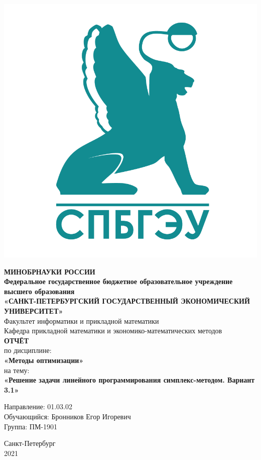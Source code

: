 \documentclass[14pt,a4paper,fleqn]{extarticle}
\begin{document}
\begin{titlepage}
	\vspace*{1cm}
	\includegraphics[scale=0.12]{logo}
	\begin{center}
		\textbf{МИНОБРНАУКИ РОССИИ}\\
		\vspace{0.2cm}
		\textbf{Федеральное государственное бюджетное образовательное учреждение высшего образования}\\
		\textbf{«САНКТ-ПЕТЕРБУРГСКИЙ ГОСУДАРСТВЕННЫЙ ЭКОНОМИЧЕСКИЙ УНИВЕРСИТЕТ»}\\
		\vspace{0.6cm}
		Факультет информатики и прикладной математики\\
		Кафедра прикладной математики и экономико-математических методов\\
		\vspace{1cm}
		\textbf{ОТЧЁТ}\\
		по дисциплине:\\
		\textbf{«Методы оптимизации»}\\
		на тему:\\
		\textbf{«Решение задачи линейного программирования симплекс-методом. Вариант 3.1»}\\
	\end{center}
	\vspace{1cm}
	Направление: 01.03.02\\
	Обучающийся: Бронников Егор Игоревич\\
	Группа: ПМ-1901\\
	\vfill
	\begin{center}
		Санкт-Петербург\\
		2021\\
	\end{center}
\end{titlepage}
\end{document}
